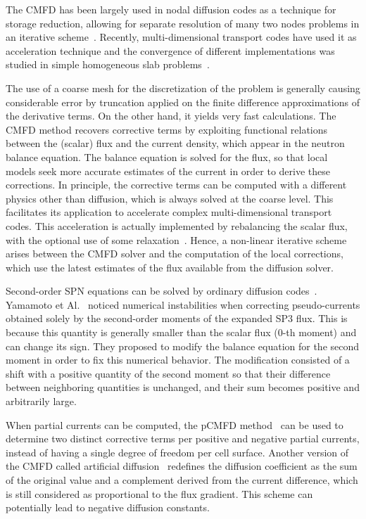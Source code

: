 \documentclass[review,3p,onecolumn,sort&compress]{elsarticle}
\begin{document}
The CMFD has been largely used in nodal diffusion codes as a technique for storage reduction, allowing for separate resolution of many two nodes problems in an iterative scheme~\cite{Smith-1983,Lawrence-1986}. Recently, multi-dimensional transport codes have used it as acceleration technique and the convergence of different implementations was studied in simple homogeneous slab problems~\cite{Jarrett-2016,Shen-2019}.

The use of a coarse mesh for the discretization of the problem is generally causing considerable error by truncation applied on the finite difference approximations of the derivative terms. On the other hand, it yields very fast calculations. The CMFD method recovers corrective terms by exploiting functional relations between the (scalar) flux and the current density, which appear in the neutron balance equation. The balance equation is solved for the flux, so that local models seek more accurate estimates of the current in order to derive these corrections. In principle, the corrective terms can be computed with a different physics other than diffusion, which is always solved at the coarse level. This facilitates its application to accelerate complex multi-dimensional transport codes. This acceleration is actually implemented by rebalancing the scalar flux, with the optional use of some relaxation~\cite{Park-2017}. Hence, a non-linear iterative scheme arises between the CMFD solver and the computation of the local corrections, which use the latest estimates of the flux available from the diffusion solver.

Second-order SPN equations can be solved by ordinary diffusion codes~\cite{Larsen-1993}. Yamamoto et Al.~\cite{Yamamoto-2016} noticed numerical instabilities when correcting pseudo-currents obtained solely by the second-order moments of the expanded SP3 flux. This is because this quantity is generally smaller than the scalar flux (0-th moment) and can change its sign. They proposed to modify the balance equation for the second moment in order to fix this numerical behavior. The modification consisted of a shift with a positive quantity of the second moment so that their difference between neighboring quantities is unchanged, and their sum becomes positive and arbitrarily large.

When partial currents can be computed, the pCMFD method~\cite{Cho-2003} can be used to determine two distinct corrective terms per positive and negative partial currents, instead of having a single degree of freedom per cell surface. Another version of the CMFD called artificial diffusion~\cite{Zhu-2016,Jarrett-2016} redefines the diffusion coefficient as the sum of the original value and a complement derived from the current difference, which is still considered as proportional to the flux gradient. This scheme can potentially lead to negative diffusion constants.
\end{document}
